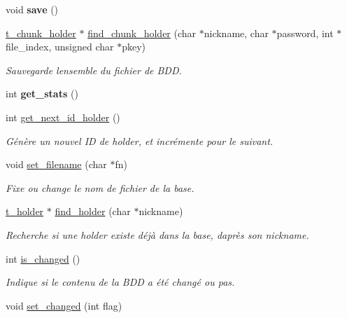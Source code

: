 \begin{DoxyCompactItemize}
void {\bfseries save} ()
\item 
\hyperlink{structt__chunk__holder}{t\+\_\+chunk\+\_\+holder} $\ast$ \hyperlink{classt__database_a827029592098239b9d39cb907fb7b305}{find\+\_\+chunk\+\_\+holder} (char $\ast$nickname, char $\ast$password, int $\ast$file\+\_\+index, unsigned char $\ast$pkey)
\begin{DoxyCompactList}\small\item\em Sauvegarde l\textquotesingle{}ensemble du fichier de B\+DD. \end{DoxyCompactList}\item 
\mbox{\label{classt__database_ab5943d7463fb7b7e7cd12a50fbd38927}} 
int {\bfseries get\+\_\+stats} ()
\item 
int \hyperlink{classt__database_a7cde073935f0fac8d91550dd59b73370}{get\+\_\+next\+\_\+id\+\_\+holder} ()
\begin{DoxyCompactList}\small\item\em Génère un nouvel ID de holder, et incrémente pour le suivant. \end{DoxyCompactList}\item 
void \hyperlink{classt__database_a3be05e92644b436dda5f8d982956743a}{set\+\_\+filename} (char $\ast$fn)
\begin{DoxyCompactList}\small\item\em Fixe ou change le nom de fichier de la base. \end{DoxyCompactList}\item 
\hyperlink{classt__holder}{t\+\_\+holder} $\ast$ \hyperlink{classt__database_a68bbcf5505e1541a1d14c604970d867c}{find\+\_\+holder} (char $\ast$nickname)
\begin{DoxyCompactList}\small\item\em Recherche si une holder existe déjà dans la base, d\textquotesingle{}après son nickname. \end{DoxyCompactList}\item 
int \hyperlink{classt__database_a1fa795936fbed825f43edb5d05457034}{is\+\_\+changed} ()
\begin{DoxyCompactList}\small\item\em Indique si le contenu de la B\+DD a été changé ou pas. \end{DoxyCompactList}\item 
\mbox{\label{classt__database_a028279aa4e7faa919b671143f72ba2ad}} 
void \hyperlink{classt__database_a028279aa4e7faa919b671143f72ba2ad}{set\+\_\+changed} (int flag)

\end{DoxyCompactItemize}
